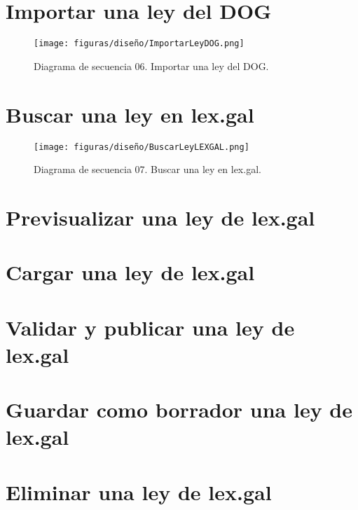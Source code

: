 \section{Importar una ley del DOG}

\begin{figure}[H]
\centerline{\texttt{[image: figuras/diseño/ImportarLeyDOG.png]}}
\caption{Diagrama de secuencia 06. Importar una ley del DOG.}
\label{enlaceDImportarDOG}
\end{figure}


\section{Buscar una ley en lex.gal}

\begin{figure}[H]
\centerline{\texttt{[image: figuras/diseño/BuscarLeyLEXGAL.png]}}
\caption{Diagrama de secuencia 07. Buscar una ley en lex.gal.}
\label{enlaceDBuscarLEXGAL}
\end{figure}


\section{Previsualizar una ley de lex.gal}


\section{Cargar una ley de lex.gal}


\section{Validar y publicar una ley de lex.gal}


\section{Guardar como borrador una ley de lex.gal}


\section{Eliminar una ley de lex.gal}
